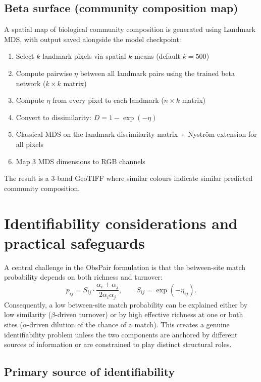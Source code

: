 \documentclass{article}
\begin{document}
\subsection{Beta surface (community composition map)}

A spatial map of biological community composition is generated using Landmark MDS, with output saved alongside the model checkpoint:
\begin{enumerate}
    \item Select $k$ landmark pixels via spatial $k$-means (default $k = 500$)
    \item Compute pairwise $\eta$ between all landmark pairs using the trained beta network ($k \times k$ matrix)
    \item Compute $\eta$ from every pixel to each landmark ($n \times k$ matrix)
    \item Convert to dissimilarity: $D = 1 - \exp(-\eta)$
    \item Classical MDS on the landmark dissimilarity matrix + Nystr\"om extension for all pixels
    \item Map 3 MDS dimensions to RGB channels
\end{enumerate}

The result is a 3-band GeoTIFF where similar colours indicate similar predicted community composition.

\section{Identifiability considerations and practical safeguards}

A central challenge in the ObsPair formulation is that the between-site match probability depends on both richness and turnover:
\begin{equation}
    p_{ij}
    =
    S_{ij}\cdot \frac{\alpha_i+\alpha_j}{2\alpha_i\alpha_j},
    \qquad
    S_{ij} = \exp(-\eta_{ij}).
\end{equation}
Consequently, a low between-site match probability can be explained either by low similarity (\(\beta\)-driven turnover) or by high effective richness at one or both sites (\(\alpha\)-driven dilution of the chance of a match). This creates a genuine identifiability problem unless the two components are anchored by different sources of information or are constrained to play distinct structural roles.

\subsection{Primary source of identifiability}
\end{document}
